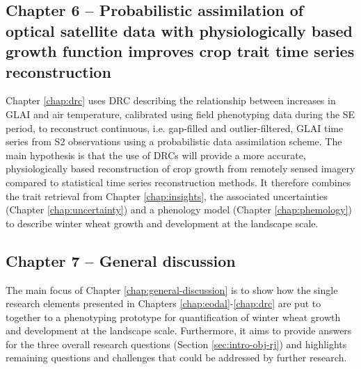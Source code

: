 \subsection*{Chapter 6 -- Probabilistic assimilation of optical satellite data with physiologically based growth function improves crop trait time series reconstruction}
Chapter \ref{chap:drc} uses \gls{DRC} describing the relationship between increases in \gls{GLAI} and air temperature, calibrated using field phenotyping data during the \gls{SE} period, to reconstruct continuous, i.e. gap-filled and outlier-filtered, \gls{GLAI} time series from \gls{S2} observations using a probabilistic data assimilation scheme. The main hypothesis is that the use of \gls{DRC}s will provide a more accurate, physiologically based reconstruction of crop growth from remotely sensed imagery compared to statistical time series reconstruction methods. It therefore combines the trait retrieval from Chapter \ref{chap:insights}, the associated uncertainties (Chapter \ref{chap:uncertainty}) and a phenology model (Chapter \ref{chap:phemology}) to describe winter wheat growth and development at the landscape scale.

\subsection*{Chapter 7 -- General discussion}
The main focus of Chapter \ref{chap:general-discussion} is to show how the single research elements presented in Chapters \ref{chap:eodal}-\ref{chap:drc} are put to together to a phenotyping prototype for quantification of winter wheat growth and development at the landscape scale. Furthermore, it aims to provide answers for the three overall research questions (Section \ref{sec:intro-obj-rj}) and highlights remaining questions and challenges that could be addressed by further research.